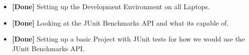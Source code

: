 \begin{itemize}
    \item \textbf{[Done]} Setting up the Development Environment on all Laptops.
    \item \textbf{[Done]} Looking at the JUnit Benchmarks API and what its capable of.
    \item \textbf{[Done]} Setting up a basic Project with JUnit tests for how we would use the JUnit Benchmarks API.
\end{itemize}

